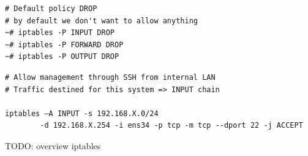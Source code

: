 \documentclass{article}
\begin{document}
\begin{verbatim}
# Default policy DROP
# by default we don't want to allow anything
~# iptables -P INPUT DROP
~# iptables -P FORWARD DROP
~# iptables -P OUTPUT DROP
\end{verbatim}

\begin{verbatim}
# Allow management through SSH from internal LAN
# Traffic destined for this system => INPUT chain

iptables –A INPUT -s 192.168.X.0/24 
        -d 192.168.X.254 -i ens34 -p tcp -m tcp --dport 22 -j ACCEPT
\end{verbatim}

TODO: overview iptables
\end{document}
